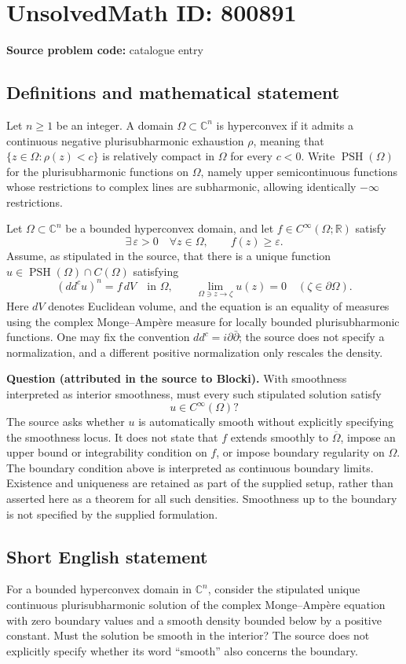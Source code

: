 \documentclass[11pt]{article}
\newcommand{\R}{\mathbb{R}}
\newcommand{\C}{\mathbb{C}}
\begin{document}
\section*{UnsolvedMath ID: 800891}
\textbf{Source problem code:} catalogue entry
\subsection{Definitions and mathematical statement}
Let \(n\geq 1\) be an integer. A domain \(\Omega\subset\C^n\) is hyperconvex if it admits a continuous negative plurisubharmonic exhaustion \(\rho\), meaning that \(\{z\in\Omega:\rho(z)<c\}\) is relatively compact in \(\Omega\) for every \(c<0\). Write \(\operatorname{PSH}(\Omega)\) for the plurisubharmonic functions on \(\Omega\), namely upper semicontinuous functions whose restrictions to complex lines are subharmonic, allowing identically \(-\infty\) restrictions.

Let \(\Omega\subset\C^n\) be a bounded hyperconvex domain, and let \(f\in C^\infty(\Omega;\R)\) satisfy
\[
\exists\,\varepsilon>0\quad\forall z\in\Omega,\qquad f(z)\geq\varepsilon.
\]
Assume, as stipulated in the source, that there is a unique function \(u\in\operatorname{PSH}(\Omega)\cap C(\Omega)\) satisfying
\[
(dd^c u)^n=f\,dV\quad\text{in }\Omega,
\qquad
\lim_{\Omega\ni z\to\zeta}u(z)=0\quad(\zeta\in\partial\Omega).
\]
Here \(dV\) denotes Euclidean volume, and the equation is an equality of measures using the complex Monge--Amp\`ere measure for locally bounded plurisubharmonic functions. One may fix the convention \(dd^c=i\partial\bar\partial\); the source does not specify a normalization, and a different positive normalization only rescales the density.

\textbf{Question (attributed in the source to Blocki).} With smoothness interpreted as interior smoothness, must every such stipulated solution satisfy
\[
u\in C^\infty(\Omega)?
\]
The source asks whether \(u\) is automatically smooth without explicitly specifying the smoothness locus. It does not state that \(f\) extends smoothly to \(\overline\Omega\), impose an upper bound or integrability condition on \(f\), or impose boundary regularity on \(\Omega\). The boundary condition above is interpreted as continuous boundary limits. Existence and uniqueness are retained as part of the supplied setup, rather than asserted here as a theorem for all such densities. Smoothness up to the boundary is not specified by the supplied formulation.
\subsection{Short English statement}
For a bounded hyperconvex domain in \(\C^n\), consider the stipulated unique continuous plurisubharmonic solution of the complex Monge--Amp\`ere equation with zero boundary values and a smooth density bounded below by a positive constant. Must the solution be smooth in the interior? The source does not explicitly specify whether its word ``smooth'' also concerns the boundary.
\end{document}
